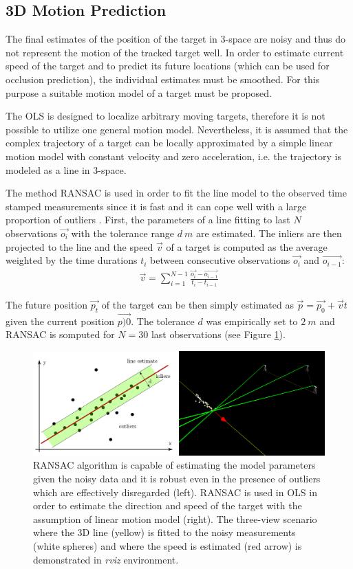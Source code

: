 \subsection{3D Motion Prediction} \label{txt:3d_motion_predicition}

The final estimates of the position of the target in 3-space are noisy and thus do not represent the motion of the tracked target well. In order to estimate current speed of the target and to predict its future locations (which can be used for occlusion prediction), the individual estimates must be smoothed. For this purpose a suitable motion model of a target must be proposed.

The OLS is designed to localize arbitrary moving targets, therefore it is not possible to utilize one general motion model. Nevertheless, it is assumed that the complex trajectory of a target can be locally approximated by a simple linear motion model with constant velocity and zero acceleration, i.e. the trajectory is modeled as a line in 3-space.

The method RANSAC is used in order to fit the line model to the observed time stamped measurements since it is fast and it can cope well with a large proportion of outliers \cite{Hartley:2003:MVG:861369}. First, the parameters of a line fitting to last $N$ observations $\vec{o_{i}}$ with the tolerance range $d~m$ are estimated. The inliers are then projected to the line and the speed $\vec{v}$ of a target is computed as the average weighted by the time durations $t_{i}$ between consecutive observations $\vec{o_{i}}$ and $\vec{o_{i-1}}$:
\begin{align}
	\vec{v} = \sum_{i=1}^{N-1}{\frac{\vec{o_{i}} - \vec{o_{i-1}}}{t_{i} - t_{i-1}}}
\end{align}

The future position $\vec{p_{t}}$ of the target can be then simply estimated as $\vec{p} = \vec{p_{0}} + \vec{v}t$ given the current position $\vec{p){0}}$. The tolerance $d$ was empirically set to $2~m$ and RANSAC is somputed for $N = 30$ last observations (see Figure \ref{fig:ransac}).

\begin{figure}[htb]
	\centering
	\includegraphics[width=0.8\linewidth]{fig/ransac_theory_rviz.png}
	\caption{RANSAC algorithm is capable of estimating the model parameters given the noisy data and it is robust even in the presence of outliers which are effectively disregarded (left). RANSAC is used in OLS in order to estimate the direction and speed of the target with the assumption of linear motion model (right). The three-view scenario where the 3D line (yellow) is fitted to the noisy measurements (white spheres) and where the speed is estimated (red arrow) is demonstrated in \textit{rviz} environment.}
	\label{fig:ransac}
\end{figure}

